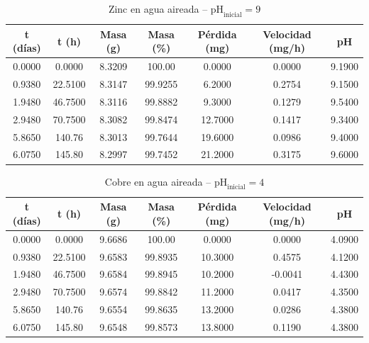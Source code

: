 \documentclass[11pt,a4paper]{article}
\begin{document}
\begin{table}[H]
\centering
\caption{Zinc en agua aireada -- $\text{pH}_{\text{inicial}} = 9$}
\label{tab:3_1_zn_ph9}
\begin{tabular}{ccccccc}
\toprule
t (días) & t (h) & Masa (g) & Masa (\%) & Pérdida (mg) & Velocidad (mg/h) & pH \\
\midrule
0.0000 & 0.0000 & 8.3209 & 100.00 & 0.0000 & 0.0000 & 9.1900 \\
0.9380 & 22.5100 & 8.3147 & 99.9255 & 6.2000 & 0.2754 & 9.1500 \\
1.9480 & 46.7500 & 8.3116 & 99.8882 & 9.3000 & 0.1279 & 9.5400 \\
2.9480 & 70.7500 & 8.3082 & 99.8474 & 12.7000 & 0.1417 & 9.3400 \\
5.8650 & 140.76 & 8.3013 & 99.7644 & 19.6000 & 0.0986 & 9.4000 \\
6.0750 & 145.80 & 8.2997 & 99.7452 & 21.2000 & 0.3175 & 9.6000 \\
\bottomrule
\end{tabular}
\end{table}

\begin{table}[H]
\centering
\caption{Cobre en agua aireada -- $\text{pH}_{\text{inicial}} = 4$}
\label{tab:3_1_cu_ph4}
\begin{tabular}{ccccccc}
\toprule
t (días) & t (h) & Masa (g) & Masa (\%) & Pérdida (mg) & Velocidad (mg/h) & pH \\
\midrule
0.0000 & 0.0000 & 9.6686 & 100.00 & 0.0000 & 0.0000 & 4.0900 \\
0.9380 & 22.5100 & 9.6583 & 99.8935 & 10.3000 & 0.4575 & 4.1200 \\
1.9480 & 46.7500 & 9.6584 & 99.8945 & 10.2000 & -0.0041 & 4.4300 \\
2.9480 & 70.7500 & 9.6574 & 99.8842 & 11.2000 & 0.0417 & 4.3500 \\
5.8650 & 140.76 & 9.6554 & 99.8635 & 13.2000 & 0.0286 & 4.3800 \\
6.0750 & 145.80 & 9.6548 & 99.8573 & 13.8000 & 0.1190 & 4.3800 \\
\bottomrule
\end{tabular}
\end{table}
\end{document}
